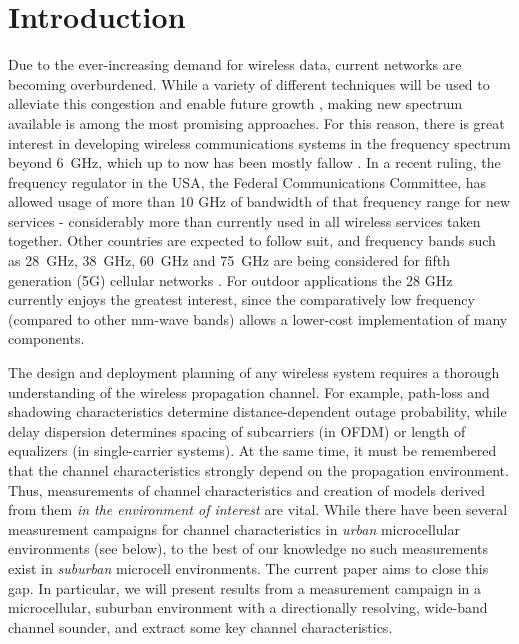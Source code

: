 \documentclass[conference]{IEEEtran}
\begin{document}
%
\IEEEpeerreviewmaketitle





\section{Introduction}

Due to the ever-increasing demand for wireless data, current networks are becoming overburdened. While a variety of different techniques will be used to alleviate this congestion and enable future growth \cite{Falahy_2017_tech} \cite{andrews2014will}, making new spectrum available is among the most promising approaches. For this reason, there is great interest in developing wireless communications systems in the frequency spectrum beyond \SI{6}{GHz}, which up to now has been mostly fallow \cite{Boccardi_2014_five}. In a recent ruling, the frequency regulator in the USA, the Federal Communications Committee, has allowed usage of more than 10 GHz of bandwidth of that frequency range for new services - considerably more than currently used in all wireless services taken together. Other countries are expected to follow suit, and  frequency bands such as \SI{28}{GHz}, \SI{38}{GHz}, \SI{60}{GHz} and \SI{75}{GHz} are being considered for fifth generation (5G) cellular networks \cite{federal_2015_matter}. For outdoor applications the 28 GHz currently enjoys the greatest interest, since the comparatively low frequency (compared to other mm-wave bands) allows a lower-cost implementation of many components. 

The design and deployment planning of any wireless system requires a thorough understanding of the wireless propagation channel. For example, path-loss and shadowing characteristics determine distance-dependent outage probability, while delay dispersion determines spacing of subcarriers (in OFDM) or length of equalizers (in single-carrier systems). At the same time, it must be remembered that the channel characteristics strongly depend on the propagation environment. Thus, measurements of channel characteristics and creation of models derived from them {\em in the environment of interest} are vital. While there have been several measurement campaigns for channel characteristics in {\em urban} microcellular environments (see below), to the best of our knowledge no such measurements exist in {\em suburban} microcell environments. The current paper aims to close this gap. In particular, we will present results from a measurement campaign in a microcellular, suburban environment with a directionally resolving, wide-band channel sounder, and extract some key channel characteristics.
 
\end{document}
